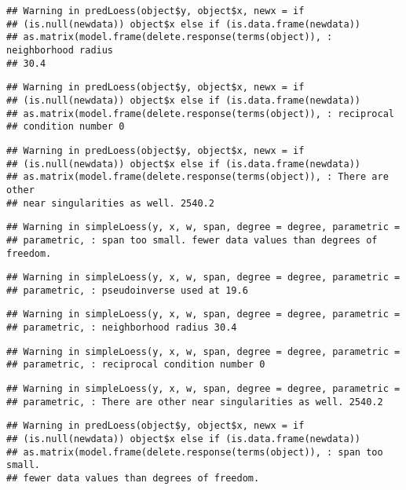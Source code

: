 \documentclass[]{article}
\begin{document}
\begin{verbatim}
## Warning in predLoess(object$y, object$x, newx = if
## (is.null(newdata)) object$x else if (is.data.frame(newdata))
## as.matrix(model.frame(delete.response(terms(object)), : neighborhood radius
## 30.4
\end{verbatim}

\begin{verbatim}
## Warning in predLoess(object$y, object$x, newx = if
## (is.null(newdata)) object$x else if (is.data.frame(newdata))
## as.matrix(model.frame(delete.response(terms(object)), : reciprocal
## condition number 0
\end{verbatim}

\begin{verbatim}
## Warning in predLoess(object$y, object$x, newx = if
## (is.null(newdata)) object$x else if (is.data.frame(newdata))
## as.matrix(model.frame(delete.response(terms(object)), : There are other
## near singularities as well. 2540.2
\end{verbatim}

\begin{verbatim}
## Warning in simpleLoess(y, x, w, span, degree = degree, parametric =
## parametric, : span too small. fewer data values than degrees of freedom.
\end{verbatim}

\begin{verbatim}
## Warning in simpleLoess(y, x, w, span, degree = degree, parametric =
## parametric, : pseudoinverse used at 19.6
\end{verbatim}

\begin{verbatim}
## Warning in simpleLoess(y, x, w, span, degree = degree, parametric =
## parametric, : neighborhood radius 30.4
\end{verbatim}

\begin{verbatim}
## Warning in simpleLoess(y, x, w, span, degree = degree, parametric =
## parametric, : reciprocal condition number 0
\end{verbatim}

\begin{verbatim}
## Warning in simpleLoess(y, x, w, span, degree = degree, parametric =
## parametric, : There are other near singularities as well. 2540.2
\end{verbatim}

\begin{verbatim}
## Warning in predLoess(object$y, object$x, newx = if
## (is.null(newdata)) object$x else if (is.data.frame(newdata))
## as.matrix(model.frame(delete.response(terms(object)), : span too small.
## fewer data values than degrees of freedom.
\end{verbatim}
\end{document}
